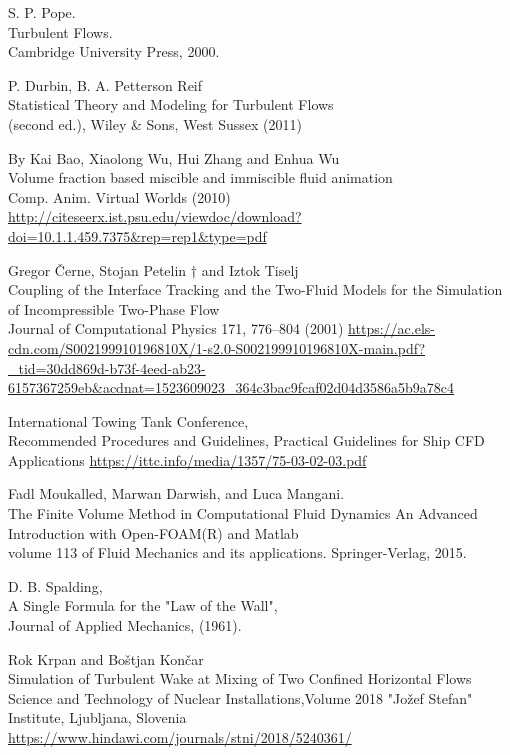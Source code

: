 \documentclass[a4paper, 12pt]{report}
\begin{document}
\begin{thebibliography}{9}
	S. P. Pope.\\
	Turbulent Flows.\\
	Cambridge University Press, 2000.

	 P. Durbin, B. A. Petterson Reif\\
	 Statistical Theory and Modeling for Turbulent Flows\\
	(second ed.), Wiley \& Sons, West Sussex (2011)
	
	By Kai Bao, Xiaolong Wu, Hui Zhang and Enhua Wu\\
	Volume fraction based miscible and immiscible fluid animation\\
	Comp. Anim. Virtual Worlds (2010)
	\url{http://citeseerx.ist.psu.edu/viewdoc/download?doi=10.1.1.459.7375&rep=rep1&type=pdf}
	
	Gregor Černe, Stojan Petelin † and Iztok Tiselj\\
	Coupling of the Interface Tracking and the Two-Fluid Models 		for the Simulation of Incompressible Two-Phase Flow\\
	Journal of Computational Physics 171, 776–804 (2001)
	\url{https://ac.els-cdn.com/S002199910196810X/1-s2.0-S002199910196810X-main.pdf?_tid=30dd869d-b73f-4eed-ab23-6157367259eb&acdnat=1523609023_364c3bac9fcaf02d04d3586a5b9a78c4}
	
	International Towing Tank Conference,\\
	Recommended Procedures and Guidelines, Practical Guidelines for Ship CFD Applications
	\url{https://ittc.info/media/1357/75-03-02-03.pdf}
	
	Fadl Moukalled, Marwan Darwish, and Luca Mangani.\\
	The Finite Volume Method in Computational Fluid Dynamics An Advanced Introduction with 	Open-FOAM(R) and Matlab\\
	volume 113 of Fluid Mechanics and its applications. Springer-Verlag, 2015.
	
	D. B. Spalding,\\
	A Single Formula for the "Law of the Wall",\\ 
	Journal of Applied Mechanics, (1961).
	
	Rok Krpan and Boštjan Končar\\
	Simulation of Turbulent Wake at Mixing of Two Confined Horizontal Flows
	Science and Technology of Nuclear Installations,Volume 2018 "Jožef Stefan" Institute, 		Ljubljana, Slovenia
	\url{https://www.hindawi.com/journals/stni/2018/5240361/}\\
	

\end{thebibliography}
\end{document}
